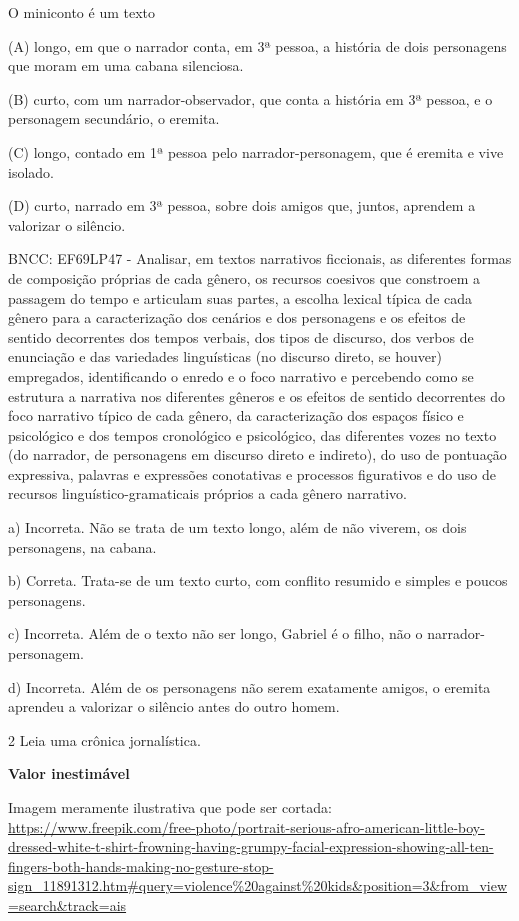 \begin{itemize}
\begin{itemize}

O miniconto é um texto

(A) longo, em que o narrador conta, em 3ª pessoa, a história de dois
personagens que moram em uma cabana silenciosa.

(B) curto, com um narrador-observador, que conta a história em 3ª
pessoa, e o personagem secundário, o eremita.

(C) longo, contado em 1ª pessoa pelo narrador-personagem, que é eremita
e vive isolado.

(D) curto, narrado em 3ª pessoa, sobre dois amigos que, juntos, aprendem
a valorizar o silêncio.

BNCC: EF69LP47 - Analisar, em textos narrativos ficcionais, as
diferentes formas de composição próprias de cada gênero, os recursos
coesivos que constroem a passagem do tempo e articulam suas partes, a
escolha lexical típica de cada gênero para a caracterização dos cenários
e dos personagens e os efeitos de sentido decorrentes dos tempos
verbais, dos tipos de discurso, dos verbos de enunciação e das
variedades linguísticas (no discurso direto, se houver) empregados,
identificando o enredo e o foco narrativo e percebendo como se estrutura
a narrativa nos diferentes gêneros e os efeitos de sentido decorrentes
do foco narrativo típico de cada gênero, da caracterização dos espaços
físico e psicológico e dos tempos cronológico e psicológico, das
diferentes vozes no texto (do narrador, de personagens em discurso
direto e indireto), do uso de pontuação expressiva, palavras e
expressões conotativas e processos figurativos e do uso de recursos
linguístico-gramaticais próprios a cada gênero narrativo.

a) Incorreta. Não se trata de um texto longo, além de não viverem, os
dois personagens, na cabana.

b) Correta. Trata-se de um texto curto, com conflito resumido e simples
e poucos personagens.

c) Incorreta. Além de o texto não ser longo, Gabriel é o filho, não o
narrador-personagem.

d) Incorreta. Além de os personagens não serem exatamente amigos, o
eremita aprendeu a valorizar o silêncio antes do outro homem.

\num{2} Leia uma crônica jornalística.

\textbf{Valor inestimável}

Imagem meramente ilustrativa que pode ser cortada:
\url{https://www.freepik.com/free-photo/portrait-serious-afro-american-little-boy-dressed-white-t-shirt-frowning-having-grumpy-facial-expression-showing-all-ten-fingers-both-hands-making-no-gesture-stop-sign_11891312.htm\#query=violence\%20against\%20kids\&position=3\&from_view=search\&track=ais}


\end{itemize}
\end{itemize}
